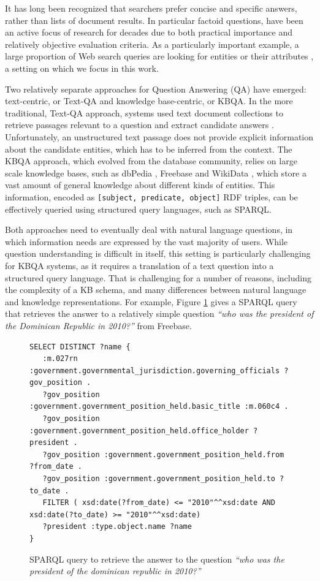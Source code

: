 It has long been recognized that searchers prefer concise and specific answers, rather than lists of document results. In particular factoid questions, have been an active focus of research for decades due to both practical importance and relatively objective evaluation criteria.
As a particularly important example, a large proportion of Web search queries are looking for entities or their attributes \cite{Pound:2010:AOR:1772690.1772769}, a setting on which we focus in this work. 

Two relatively separate approaches for Question Answering (QA) have emerged: text-centric, or Text-QA and knowledge base-centric, or KBQA.
In the more traditional, Text-QA approach, systems used text document collections to retrieve passages relevant to a question and extract candidate answers \cite{dang2007overview}.
Unfortunately, an unstructured text passage does not provide explicit information about the candidate entities, which has to be inferred from the context.
The KBQA approach, which evolved from the database community, relies on large scale knowledge bases, such as dbPedia \cite{auer2007dbpedia}, Freebase \cite{Bollacker:2008:FCC:1376616.1376746} and WikiData \cite{Vrandecic:2014:WFC:2661061.2629489}, which store a vast amount of general knowledge about different kinds of entities.
This information, encoded as \texttt{[subject, predicate, object]} RDF triples, can be effectively queried using structured query languages, such as SPARQL.

Both approaches need to eventually deal with natural language questions, in which information needs are expressed by the vast majority of users.
While question understanding is difficult in itself, this setting is particularly challenging for KBQA systems, as it requires a translation of a text question into a structured query language.
That is challenging for a number of reasons, including the complexity of a KB schema, and many differences between natural language and knowledge representations. 
For example, Figure \ref{fig:example_sparql} gives a SPARQL query that retrieves the answer to a relatively simple question \textit{``who was the president of the Dominican Republic in 2010?''} from Freebase.

\begin{figure}
\centering
\begin{lstlisting}[frame=single,basicstyle=\small]
SELECT DISTINCT ?name {
   :m.027rn :government.governmental_jurisdiction.governing_officials ?gov_position .
   ?gov_position :government.government_position_held.basic_title :m.060c4 .
   ?gov_position :government.government_position_held.office_holder ?president .
   ?gov_position :government.government_position_held.from ?from_date .
   ?gov_position :government.government_position_held.to ?to_date .
   FILTER ( xsd:date(?from_date) <= "2010"^^xsd:date AND xsd:date(?to_date) >= "2010"^^xsd:date)
   ?president :type.object.name ?name
}
\end{lstlisting}
\caption{SPARQL query to retrieve the answer to the question \textit{``who was the president of the dominican republic in 2010?''}}
\label{fig:example_sparql}
\end{figure}

